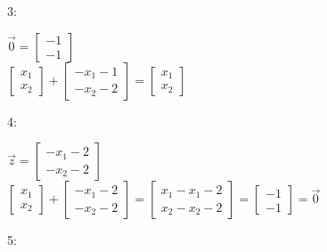 \begin{solution}
		    3:\\
		    
		    \begin{center}
		    $
		    \Vec{0} 
		    = 
		    \begin{bmatrix}
		         -1 \\ -1
		        \end{bmatrix}
		        $
		        \\
		        $
		        \begin{bmatrix}
		         x_1 \\ x_2
		        \end{bmatrix}
		        +
		        \begin{bmatrix}
		         -x_1-1 \\ -x_2-2
		        \end{bmatrix}
		        =
		        \begin{bmatrix}
		         x_1 \\ x_2
		        \end{bmatrix}
		    $
		    \end{center}
		    
		    
		   4:\\
		   
		   \begin{center}
		    $
		    \Vec{z} 
		    = 
		    \begin{bmatrix}
		         -x_1-2 \\ -x_2-2
		        \end{bmatrix}
		        $
		        \\
		        $
		    \begin{bmatrix}
		         x_1 \\ x_2
		    \end{bmatrix}
		    +
		    \begin{bmatrix}
		         -x_1-2 \\ -x_2-2
		    \end{bmatrix}
		    = 
		    \begin{bmatrix}
		         x_1-x_1-2 \\ x_2-x_2-2
		        \end{bmatrix}
		        =
		        \begin{bmatrix}
		         -1 \\ -1
		    \end{bmatrix}
		    =
		    \Vec{0}
		    $
		    \end{center}
		   
		   
		   5:\\
		   

\end{solution}

